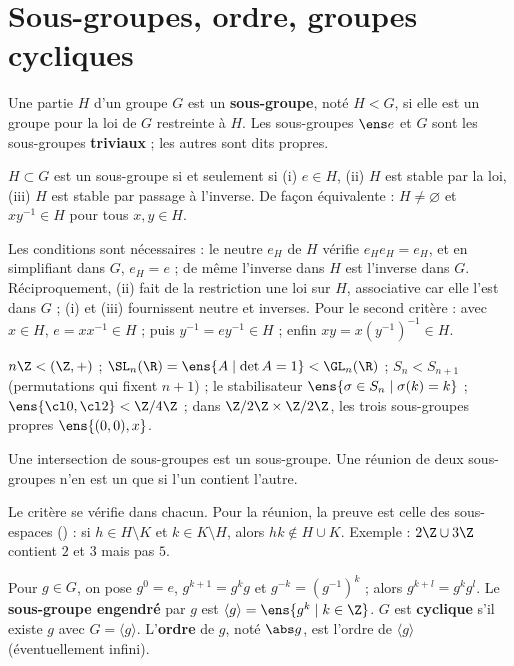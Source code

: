 \section{Sous-groupes, ordre, groupes cycliques}
\begin{definition}
Une partie $H$ d'un groupe $G$ est un \textbf{sous-groupe}, noté $H<G$, si elle est un groupe pour la loi de $G$ restreinte à $H$. Les sous-groupes $\ens e$ et $G$ sont les sous-groupes \textbf{triviaux} ; les autres sont dits propres.
\end{definition}
\begin{theoreme}\label{thm-critere-sg}
$H\subset G$ est un sous-groupe si et seulement si (i) $e\in H$, (ii) $H$ est stable par la loi, (iii) $H$ est stable par passage à l'inverse. De façon équivalente : $H\neq\varnothing$ et $xy^{-1}\in H$ pour tous $x,y\in H$.
\end{theoreme}
\begin{preuve}
Les conditions sont nécessaires : le neutre $e_H$ de $H$ vérifie $e_He_H=e_H$, et en simplifiant dans $G$, $e_H=e$ ; de même l'inverse dans $H$ est l'inverse dans $G$. Réciproquement, (ii) fait de la restriction une loi sur $H$, associative car elle l'est dans $G$ ; (i) et (iii) fournissent neutre et inverses. Pour le second critère : avec $x\in H$, $e=xx^{-1}\in H$ ; puis $y^{-1}=ey^{-1}\in H$ ; enfin $xy=x(y^{-1})^{-1}\in H$.
\end{preuve}
\begin{exemple}
$n\Z<(\Z,+)$ ; $\SL_n(\R)=\ens{A\mid\det A=1}<\GL_n(\R)$ ; $S_n<S_{n+1}$ (permutations qui fixent $n+1$) ; le stabilisateur $\ens{\sigma\in S_n\mid\sigma(k)=k}$ ; $\ens{\cl0,\cl2}<\Z/4\Z$ ; dans $\Z/2\Z\times\Z/2\Z$, les trois sous-groupes propres $\ens{(0,0),x}$.
\end{exemple}
\begin{proposition}\label{prop-inter-sg}
Une intersection de sous-groupes est un sous-groupe. Une réunion de deux sous-groupes n'en est un que si l'un contient l'autre.
\end{proposition}
\begin{preuve}
Le critère se vérifie dans chacun. Pour la réunion, la preuve est celle des sous-espaces () : si $h\in H\setminus K$ et $k\in K\setminus H$, alors $hk\notin H\cup K$. Exemple : $2\Z\cup3\Z$ contient $2$ et $3$ mais pas $5$.
\end{preuve}
\begin{definition}
Pour $g\in G$, on pose $g^0=e$, $g^{k+1}=g^kg$ et $g^{-k}=(g^{-1})^k$ ; alors $g^{k+l}=g^kg^l$. Le \textbf{sous-groupe engendré} par $g$ est $\langle g\rangle=\ens{g^k\mid k\in\Z}$. $G$ est \textbf{cyclique} s'il existe $g$ avec $G=\langle g\rangle$. L'\textbf{ordre} de $g$, noté $\abs g$, est l'ordre de $\langle g\rangle$ (éventuellement infini).
\end{definition}
